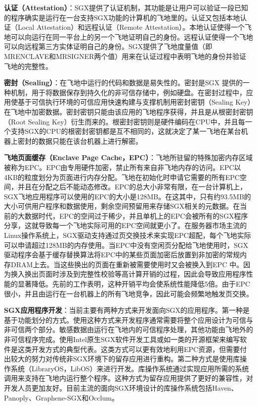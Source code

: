 \textbf{认证（Attestation）}：SGX提供了认证机制，其功能是让用户可以验证一段已知的程序确实是运行在一台支持SGX功能的计算机的飞地里的。认证又包括本地认证（Local Attestation）和远程认证（Remote Attestation）。本地认证使得一个飞地可以向运行在同一平台上的另一个飞地证明自己的身份。远程认证使得一个飞地可以向远程第三方实体证明自己的身份。SGX提供了飞地度量值（即MRENCLAVE和MRSIGNER两个值）用来在认证过程中表明飞地的身份并验证飞地的完整性。

\textbf{密封（Sealing）}：在飞地中运行的代码和数据是易失性的。密封是SGX 提供的一种机制，用于将数据保存到持久化的非可信存储中，例如硬盘。在密封过程中，应用使基于可信执行环境的可信应用快速构建与支撑机制用密封密钥（Sealing Key）在飞地中加密数据。密封密钥只能由该应用的飞地程序获得，并且是从根密封密钥（Root Sealing Key）衍生而来的。根密封密钥则是硬件编码在CPU中，并且每一个支持SGX的CPU的根密封密钥都是互不相同的，这就决定了某一飞地在某台机器上密封的数据只能在该台机器上进行解密。

\textbf{飞地页面缓存（Enclave Page Cache，EPC）}：飞地所驻留的特殊加密内存区域被称为EPC。EPC由专用硬件加密，禁止所有来自非飞地内存的访问。EPC以4KB的粒度划分为页面进行内存分配。飞地在初始化时申请它需要的所有EPC空间，并且在分配之后不能动态修改。EPC的总大小非常有限，在一台计算机上，SGX飞地应用程序可以使用的EPC的大小是128MB。在这其中，只有约93.5MB的大小可供用户程序和数据使用，剩余空间预留用来存储SGX相关的元数据。在当前的大数据时代，EPC的空间过于稀少，并且单机上的EPC会被所有的SGX程序分享，这就导致每一个飞地实际可用的EPC空间就更小了。在服务器市场主流的Linux操作系统上，SGX驱动支持通过页交换技术来实现EPC超配，每个飞地实际可以申请超过128MB的内存使用。当EPC中没有空闲页分配给飞地使用时，SGX驱动程序会基于缓存替换算法将EPC中的某些页面加密后放置到非加密的常规内存DRAM上去。当这些换出的页面在重新被需要使用时又会被换入到EPC 中。因为换入换出页面时涉及到完整性校验等高计算开销的过程，因此会导致应用程序性能的显著降低。先前的工作表明，这种开销平均会使系统性能降低5倍\parencite{taassori2018vault}。由于EPC很小，并且由运行在一台机器上的所有飞地竞争，因此可能会频繁地触发页交换。

\textbf{SGX应用程序开发}：当前主要有两种方式来开发面向SGX的应用程序。第一种是基于功能划分的方式。使用这种方式来开发程序通常需要将整个应用设计为可信与非可信两个部分。敏感数据由运行在飞地内的可信程序处理，其他功能由飞地外的非可信程序完成。使用Intel原生SGX软件开发工具或如一类的开源框架来编写软件是这类开发方式的典型代表。这类方式可以更有效地利用EPC资源，但需要付出较大的努力对传统非SGX环境下的留存应用进行重构。第二种方式是使用库操作系统（LibraryOS，LibOS）\parencite{engler1995exokernel}来进行开发。库操作系统通过实现应用所需的系统调用来支持在飞地内运行整个程序。这种方式为留存应用提供了更好的兼容性，对开发人员更加友好。目前主流的面向SGX环境设计的库操作系统包括Haven\parencite{baumann2015shielding}、Panoply\parencite{shinde2017panoply}、Graphene-SGX\parencite{tsai2017graphene}和Occlum\parencite{shen2020occlum}。

